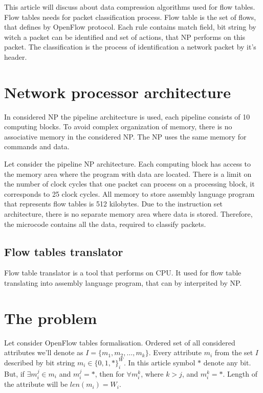 \documentclass[conference]{IEEEtran}
\begin{document}
        This article will discuss about data compression algorithms used for flow tables. 
        Flow tables needs for packet classification process. Flow table is the set of flows, that defines
        by OpenFlow protocol. Each rule contains match field, bit string by witch a packet can be identified 
        and set of actions, that NP performs on this packet.
        The classification is the process of identification a network packet by it's header. 
        
    \section{Network processor architecture}
            \label{section:problem}
        In considered NP the pipeline architecture is used, each pipeline consists of 10 computing blocks. 
        To avoid complex organization of memory, there is no associative memory in the considered NP. 
        The NP uses the same memory for commands and data.
         
        Let consider the pipeline NP architecture. 
        Each computing block has access to the memory area where the program with data are located.
        There is a limit on the number of clock cycles that one packet can process on a processing block, 
        it corresponds to 25 clock cycles.
        All memory to store assembly language program that represents flow tables is 512 kilobytes.
        Due to the instruction set architecture, there is no separate memory area where data is stored. 
        Therefore, the microcode contains all the data, required to classify packets.
        \subsection{Flow tables translator}
            Flow table translator is a tool that performs on CPU. It used for flow table translating
            into assembly language program, that can by interprited by NP.
    \section{The problem}
    \label{sect:problem}
        Let consider OpenFlow tables formalisation. Ordered set of all considered attributes we'll denote as \(I=\{m_1,m_2,\ldots,m_k\}\). 
        Every attribute \(m_i\) from the set \(I\) described by bit string \(m_i \in \{0, 1, *\}^W_i\).
        In this article symbol \(*\) denote any bit. But, if \(\exists m_i^j \in m_i\) and  \( m_i^j = *\), 
        then for \( \forall m_i^k \), where \(k > j\), and \( m_i^k = *\). Length of the attribute will be \(len(m_i) = W_i\).
\end{document}
